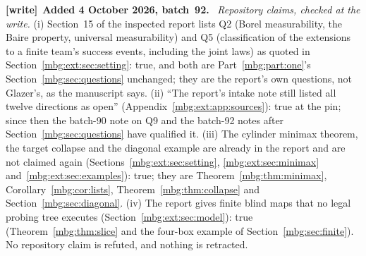 \documentclass[11pt,letterpaper]{article}
\theoremstyle{definition}
\newenvironment{writenote}[1][]{\par\smallskip\begingroup\small
 \noindent\textbf{[write]}\if\relax\detokenize{#1}\relax\else~\textbf{#1.}\fi\ }%
 {\par\endgroup\smallskip}
\begin{document}
\begin{writenote}[Added 4 October 2026, batch~92]
\emph{Repository claims, checked at the write.} (i) Section~15 of the inspected report lists Q2 (Borel measurability, the Baire property, universal measurability) and Q5 (classification of the extensions to a finite team's success events, including the joint laws) as quoted in Section~\ref{mbg:ext:sec:setting}: true, and both are Part~\ref{mbg:part:one}'s Section~\ref{mbg:sec:questions} unchanged; they are the report's own questions, not Glazer's, as the manuscript says. (ii) ``The report's intake note still listed all twelve directions as open'' (Appendix~\ref{mbg:ext:app:sources}): true at the pin; since then the batch-90 note on Q9 and the batch-92 notes after Section~\ref{mbg:sec:questions} have qualified it. (iii) The cylinder minimax theorem, the target collapse and the diagonal example are already in the report and are not claimed again (Sections~\ref{mbg:ext:sec:setting}, \ref{mbg:ext:sec:minimax} and~\ref{mbg:ext:sec:examples}): true; they are Theorem~\ref{mbg:thm:minimax}, Corollary~\ref{mbg:cor:lists}, Theorem~\ref{mbg:thm:collapse} and Section~\ref{mbg:sec:diagonal}. (iv) The report gives finite blind maps that no legal probing tree executes (Section~\ref{mbg:ext:sec:model}): true (Theorem~\ref{mbg:thm:slice} and the four-box example of Section~\ref{mbg:sec:finite}). No repository claim is refuted, and nothing is retracted.


\end{writenote}
\end{document}
